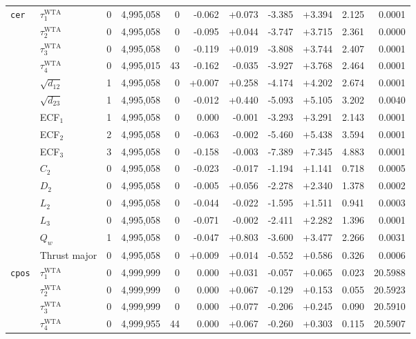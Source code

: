 {\begin{longtable}{llrrrrrrrrr}
\texttt{cer} & $\tau_1^{\mathrm{WTA}}$ & 0 & 4{,}995{,}058 & 0 & -0.062 & +0.073 & -3.385 & +3.394 & 2.125 & 0.0001 \\
 & $\tau_2^{\mathrm{WTA}}$ & 0 & 4{,}995{,}058 & 0 & -0.095 & +0.044 & -3.747 & +3.715 & 2.361 & 0.0000 \\
 & $\tau_3^{\mathrm{WTA}}$ & 0 & 4{,}995{,}058 & 0 & -0.119 & +0.019 & -3.808 & +3.744 & 2.407 & 0.0001 \\
 & $\tau_4^{\mathrm{WTA}}$ & 0 & 4{,}995{,}015 & 43 & -0.162 & -0.035 & -3.927 & +3.768 & 2.464 & 0.0001 \\
 & $\sqrt{d_{12}}$ & 1 & 4{,}995{,}058 & 0 & +0.007 & +0.258 & -4.174 & +4.202 & 2.674 & 0.0001 \\
 & $\sqrt{d_{23}}$ & 1 & 4{,}995{,}058 & 0 & -0.012 & +0.440 & -5.093 & +5.105 & 3.202 & 0.0040 \\
 & ECF$_1$ & 1 & 4{,}995{,}058 & 0 & 0.000 & -0.001 & -3.293 & +3.291 & 2.143 & 0.0001 \\
 & ECF$_2$ & 2 & 4{,}995{,}058 & 0 & -0.063 & -0.002 & -5.460 & +5.438 & 3.594 & 0.0001 \\
 & ECF$_3$ & 3 & 4{,}995{,}058 & 0 & -0.158 & -0.003 & -7.389 & +7.345 & 4.883 & 0.0001 \\
 & $C_2$ & 0 & 4{,}995{,}058 & 0 & -0.023 & -0.017 & -1.194 & +1.141 & 0.718 & 0.0005 \\
 & $D_2$ & 0 & 4{,}995{,}058 & 0 & -0.005 & +0.056 & -2.278 & +2.340 & 1.378 & 0.0002 \\
 & $L_2$ & 0 & 4{,}995{,}058 & 0 & -0.044 & -0.022 & -1.595 & +1.511 & 0.941 & 0.0003 \\
 & $L_3$ & 0 & 4{,}995{,}058 & 0 & -0.071 & -0.002 & -2.411 & +2.282 & 1.396 & 0.0001 \\
 & $Q_w$ & 1 & 4{,}995{,}058 & 0 & -0.047 & +0.803 & -3.600 & +3.477 & 2.266 & 0.0031 \\
 & Thrust major & 0 & 4{,}995{,}058 & 0 & +0.009 & +0.014 & -0.552 & +0.586 & 0.326 & 0.0006 \\
\midrule
\texttt{cpos} & $\tau_1^{\mathrm{WTA}}$ & 0 & 4{,}999{,}999 & 0 & 0.000 & +0.031 & -0.057 & +0.065 & 0.023 & 20.5988 \\
 & $\tau_2^{\mathrm{WTA}}$ & 0 & 4{,}999{,}999 & 0 & 0.000 & +0.067 & -0.129 & +0.153 & 0.055 & 20.5923 \\
 & $\tau_3^{\mathrm{WTA}}$ & 0 & 4{,}999{,}999 & 0 & 0.000 & +0.077 & -0.206 & +0.245 & 0.090 & 20.5910 \\
 & $\tau_4^{\mathrm{WTA}}$ & 0 & 4{,}999{,}955 & 44 & 0.000 & +0.067 & -0.260 & +0.303 & 0.115 & 20.5907 \\

\end{longtable}}
